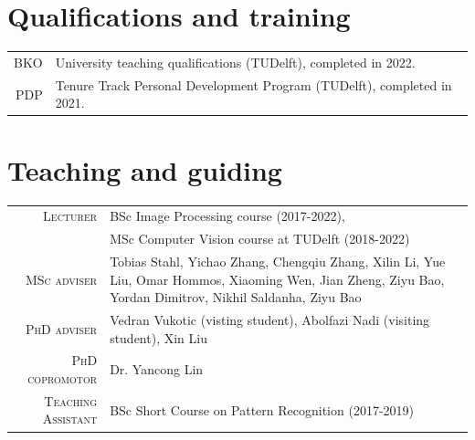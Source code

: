 \documentclass[a4paper, oneside, final]{scrartcl}
\begin{document}
\begin{center}
		\section{Qualifications and training}
		\begin{tabular}{r@{\hskip 0.3in}p{12.3cm}}
            \textsc{BKO}                   & University teaching qualifications (TUDelft), completed in 2022.\\
            \textsc{PDP}                   & Tenure Track Personal Development Program (TUDelft), completed in 2021.\\
		\end{tabular}
		\section{Teaching and guiding}
		\begin{tabular}{r@{\hskip 0.3in}p{12.3cm}}
			\textsc{Lecturer}		            & BSc Image Processing course (2017-2022),\\
                                                & MSc Computer Vision course at TUDelft (2018-2022)\\
			\textsc{MSc adviser}                & Tobias Stahl, Yichao Zhang, Chengqiu Zhang, Xilin Li, Yue Liu, Omar Hommos, Xiaoming Wen, Jian Zheng, Ziyu Bao, Yordan Dimitrov, Nikhil Saldanha, Ziyu Bao\\
			\textsc{PhD adviser}                & Vedran Vukotic (visting student), Abolfazi Nadi (visiting student), Xin Liu\\ 
			\textsc{PhD copromotor}             & Dr. Yancong Lin\\ 
            \textsc{Teaching Assistant}         & BSc Short Course on Pattern Recognition (2017-2019)\\
		\end{tabular}

\end{center}
\end{document}
